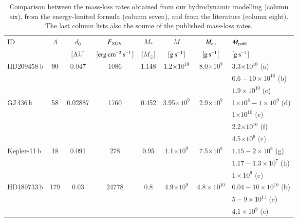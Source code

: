 \documentclass{aa}
\def\ergscm{$\rm erg\,cm^{-2}\,s^{-1}$}
\def\Mo{\ensuremath{M_{\odot}}}
\def\gs{$\rm g\,s^{-1}$}
\begin{document}
\begin{table*}
\caption{Comparison between the mass-loss rates obtained from our hydrodynamic modelling (column six), from the energy-limited formula (column seven), and from the literature (column eight). The last column lists also the source of the published mass-loss rates.} \label{tab:comparison} \centering
\begin{tabular}{l|c|c|c|c|c|c|l}
\hline \hline
ID & $\Lambda$ & $d_0$ & $F_{\rm XUV}$ & $M_*$ & $\dot{M}$ & $\dot{M}_{\rm en}$ & $\dot{M}_{\rm publ}$ \\
   &           & [AU]  & [\ergscm]     & [\Mo] & [\gs]     & [\gs]              & [\gs]                \\
\hline
HD209458\,b &  90 & 0.047   & 1086  & 1.148     & 1.2$\times10^{10}$ & 8.0$\times 10^{9}$  & 3.3$\times 10^{10}$ (a) \\
            &     &         &       &           &                    &                     & $0.6-10\times 10^{10}$ (b) \\
            &     &         &       &           &                    &                     & $1.9\times 10^{10}$ (c) \\
\hline
GJ\,436\,b  & 58  & 0.02887 & 1760  & 0.452     & 3.95$\times10^{9}$  &  2.9$\times10^{9}$  & 1$\times 10^8-1\times 10^9$ (d) \\
            &     &         &       &           &                    &                     & 1$\times 10^{10}$ (e) \\
            &     &         &       &           &                    &                     & 2.2$\times 10^{10}$ (f) \\
            &     &         &       &           &                    &                     & 4.5$\times 10^9$ (c)  \\
\hline
Kepler-11\,b& 18  & 0.091   & 278   & 0.95      & 1.1$\times10^{9}$  &  7.5$\times 10^{8}$ & $1.15-2\times 10^8$ (g)\\
            &     &         &       &           &                    &                     & $1.17-1.3\times 10^7$ (h) \\
            &     &         &       &           &                    &                     & $1\times 10^9$ (e) \\
\hline
HD189733\,b & 179 & 0.03    & 24778 & 0.8       & 4.9$\times 10^{9}$ &  $4.8\times 10^{10}$& $0.04-10\times 10^{10}$ (b) \\
            &     &         &       &           &                    &                     & $5-9\times 10^{11}$ (e)\\
            &     &         &       &           &                    &                     & $4.1\times 10^9$ (c)  \\
\hline
\end{tabular}
\end{table*}
\end{document}
